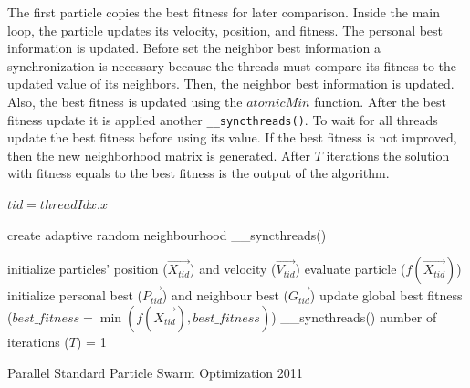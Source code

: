 \documentclass{article}
\begin{document}
    The first particle copies the best fitness for later comparison.
    Inside the main loop, the particle updates its velocity, position, and fitness.
    The personal best information is updated.
    Before set the neighbor best information a synchronization is necessary because the threads must compare its fitness to the updated value of its neighbors.
    Then, the neighbor best information is updated. Also, the best fitness is updated using the $atomicMin$ function.
    After the best fitness update it is applied another \texttt{\_\_syncthreads()}. To wait for all threads update the best fitness before using its value.
    If the best fitness is not improved, then the new neighborhood matrix is generated.
    After $T$ iterations the solution with fitness equals to the best fitness is the output of the algorithm.

    \begin{algorithm}[!htb]
        
        $tid = threadIdx.x\;$

        create adaptive random neighbourhood\;
        \_\_syncthreads()\;

        initialize particles' position ($\vec{X_{tid}}$) and velocity ($\vec{V_{tid}}$)\;
        evaluate particle ($f(\vec{X_{tid}})$)\;
        initialize personal best ($\vec{P_{tid}}$) and neighbour best ($\vec{G_{tid}}$)\;
        update global best fitness ($best\_fitness=\min(f(\vec{X_{tid}}), best\_fitness)$)\;
        \_\_syncthreads()\;
        number of iterations ($T$) = 1\;
        
        
        \caption{Parallel Standard Particle Swarm Optimization 2011}
        \label{alg:pspso2011}
    \end{algorithm}
\end{document}

